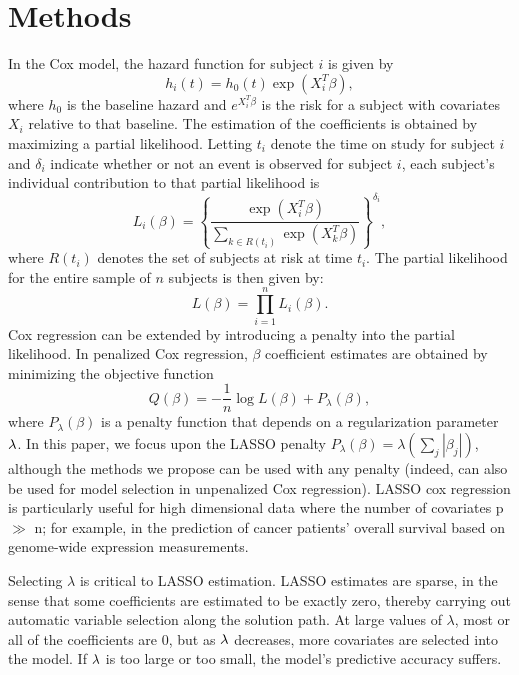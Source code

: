 \section{Methods}

\par In the Cox model, the hazard function for subject $i$ is given by 
\begin{equation*}
  h_{i}(t) = h_{0}(t) \exp( X_{i}^{T} \beta),
\end{equation*} 
where $h_{0}$ is the baseline hazard and $e^{X_i^{T} \beta}$ is the risk for a subject with covariates $X_i$ relative to that baseline.  The estimation of the coefficients is obtained by maximizing a partial likelihood.  Letting $t_i$ denote the time on study for subject $i$ and $\delta_{i}$ indicate whether or not an event is observed for subject $i$, each subject's individual contribution to that partial likelihood is
\begin{equation*}
  L_{i}(\beta) = \left \{\frac{\exp ( X_{i}^{T} \beta)}{\sum_{ k \in R(t_{i})}\exp ( X_{k}^{T} \beta)}\right \}^{\delta_{i}},
\end{equation*}
where $R(t_{i})$ denotes the set of subjects at risk at time $t_{i}$.  The partial likelihood for the entire sample of $n$ subjects is then given by:
\begin{equation*}
  L(\beta) =\prod_{i = 1}^{n} L_{i}(\beta).
\end{equation*}
Cox regression can be extended by introducing a penalty into the partial likelihood.  In penalized Cox regression, $\beta$ coefficient estimates are obtained by minimizing the objective function
\begin{equation}
  \label{eq:obj}
  Q(\beta) = - \frac{1}{n} \log L(\beta) + P_{\lambda}(\beta),
\end{equation}
where $P_{\lambda}(\beta)$ is a penalty function that depends on a regularization parameter $\lambda$. In this paper, we focus upon the LASSO penalty $P_{\lambda}(\beta) = \lambda (\sum_{j} |\beta_{j}|)$, although the methods we propose can be used with any penalty (indeed, can also be used for model selection in unpenalized Cox regression).  LASSO cox regression is particularly useful for high dimensional data where the number of covariates p $\gg$ n; for example, in the prediction of cancer patients' overall survival based on genome-wide expression measurements.

\par Selecting $\lambda$ is critical to LASSO estimation. LASSO estimates are sparse, in the sense that some coefficients are estimated to be exactly zero, thereby carrying out automatic variable selection along the solution path. At large values of $\lambda$, most or all of the coefficients are 0, but as $\lambda$ decreases, more covariates are selected into the model. If $\lambda$ is too large or too small, the model's predictive accuracy suffers.

